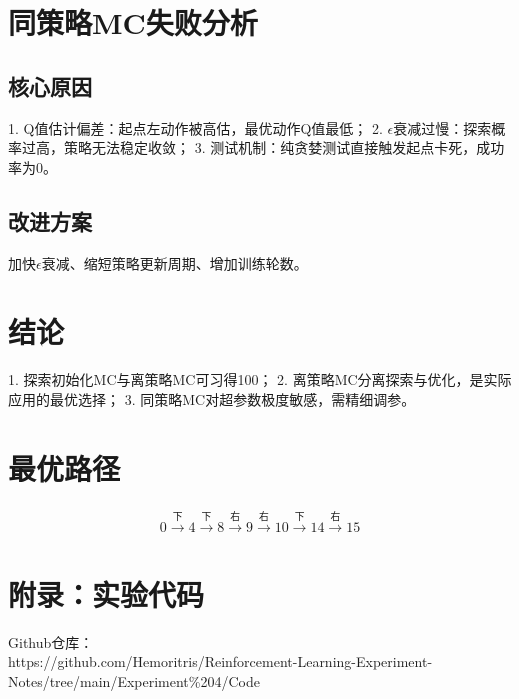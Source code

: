 \documentclass[11pt,a4paper]{article}
\begin{document}
\section{同策略MC失败分析}
\subsection{核心原因}
1. Q值估计偏差：起点左动作被高估，最优动作Q值最低；
2. $\epsilon$衰减过慢：探索概率过高，策略无法稳定收敛；
3. 测试机制：纯贪婪测试直接触发起点卡死，成功率为0。

\subsection{改进方案}
加快$\epsilon$衰减、缩短策略更新周期、增加训练轮数。

\section{结论}
1. 探索初始化MC与离策略MC可习得100；
2. 离策略MC分离探索与优化，是实际应用的最优选择；
3. 同策略MC对超参数极度敏感，需精细调参。

\section{最优路径}
\[
\begin{array}{c}
0 \xrightarrow{\text{下}} 4 \xrightarrow{\text{下}} 8 \xrightarrow{\text{右}} 9 \xrightarrow{\text{右}} 10 \xrightarrow{\text{下}} 14 \xrightarrow{\text{右}} 15
\end{array}
\]

\section{附录：实验代码}
Github仓库：\\https://github.com/Hemoritris/Reinforcement-Learning-Experiment-Notes/tree/main/Experiment\%204/Code
\end{document}
